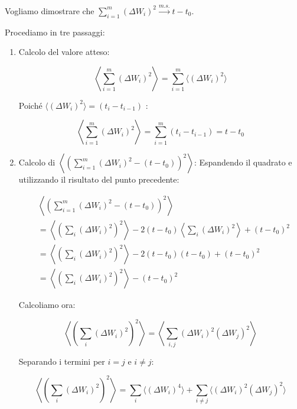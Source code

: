 Vogliamo dimostrare che $\sum_{i=1}^m (\Delta W_i)^2 \xrightarrow{m.s.} t-t_0$.

Procediamo in tre passaggi:

\begin{enumerate}
    \item Calcolo del valore atteso:
    
    
    \begin{equation}
    \left\langle \sum_{i=1}^m (\Delta W_i)^2 \right\rangle = \sum_{i=1}^m \langle (\Delta W_i)^2 \rangle
    \end{equation}
    
    
    Poiché $\langle (\Delta W_i)^2 \rangle = (t_i - t_{i-1})$   :
    
    
    \begin{equation}
    \left\langle \sum_{i=1}^m (\Delta W_i)^2 \right\rangle = \sum_{i=1}^m (t_i - t_{i-1}) = t - t_0
    \end{equation}
    
    
\item Calcolo di $\left \langle \left( \sum_{i=1}^m (\Delta W_i)^2 - (t-t_0) \right)^2 \right \rangle$:
Espandendo il quadrato e utilizzando il risultato del punto precedente:
    
 
    \begin{align}
    &\left\langle \left( \sum_{i=1}^m (\Delta W_i)^2 - (t-t_0) \right)^2 \right\rangle \nonumber \\
    &= \left\langle \left( \sum_{i}(\Delta W_{i})^{2} \right)^{2} \right\rangle - 2(t-t_0)\left\langle \sum_{i}(\Delta W_{i})^{2} \right\rangle + (t-t_0)^{2} \nonumber \\
    &= \left\langle \left( \sum_{i}(\Delta W_{i})^{2} \right)^{2} \right\rangle - 2(t-t_0)(t-t_0) + (t-t_0)^{2} \nonumber \\
    &= \left\langle \left( \sum_{i}(\Delta W_{i})^{2} \right)^{2} \right\rangle - (t-t_0)^{2}
    \end{align}

    
    Calcoliamo ora: 
    
    $$
    \left\langle \left( \sum_{i}(\Delta W_{i})^{2} \right)^{2} \right\rangle = \left\langle \sum_{i,j}(\Delta W_{i})^{2}(\Delta W_{j})^{2} \right\rangle
    $$
    
    Separando i termini per $i=j$ e $i \neq j$:
    

    \begin{equation}
    \left\langle \left( \sum_{i}(\Delta W_{i})^{2} \right)^{2} \right\rangle = \sum_{i}\langle(\Delta W_{i})^{4}\rangle + \sum_{i \neq j}\langle(\Delta W_{i})^{2}(\Delta W_{j})^{2}\rangle
    \end{equation}


\end{enumerate}
